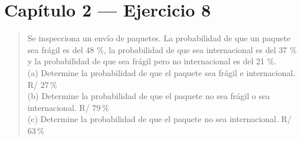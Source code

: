 \documentclass[11pt]{article}
\begin{document}
\section*{Capítulo 2 --- Ejercicio 8}

\begin{quote}
Se inspecciona un envío de paquetes. La probabilidad de que un paquete sea frágil es del 48 \%,
la probabilidad de que sea internacional es del 37 \% y la probabilidad de que sea frágil pero no
internacional es del 21 \%.\\
(a) Determine la probabilidad de que el paquete sea frágil e internacional. \hfill R/ $27$\,\%\\
(b) Determine la probabilidad de que el paquete no sea frágil o sea internacional. \hfill R/ $79$\,\%\\
(c) Determine la probabilidad de que el paquete no sea internacional. \hfill R/ $63$\,\%
\end{quote}
\end{document}
